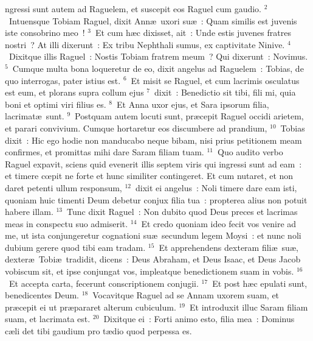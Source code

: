 \bchapter
{}ngressi sunt autem ad Raguelem, et suscepit eos Raguel cum gaudio.
${}^{2}$~Intuensque Tobiam Raguel, dixit Ann\ae\ uxori su\ae~: Quam similis est juvenis iste consobrino meo~!
${}^{3}$~Et cum h\ae c dixisset, ait~: Unde estis juvenes fratres nostri~? At illi dixerunt~: Ex tribu Nephthali sumus, ex captivitate Ninive.
${}^{4}$~Dixitque illis Raguel~: Nostis Tobiam fratrem meum~? Qui dixerunt~: Novimus.
${}^{5}$~Cumque multa bona loqueretur de eo, dixit angelus ad Raguelem~: Tobias, de quo interrogas, pater istius est.
${}^{6}$~Et misit se Raguel, et cum lacrimis osculatus est eum, et plorans supra collum ejus
${}^{7}$~dixit~: Benedictio sit tibi, fili mi, quia boni et optimi viri filius es.
${}^{8}$~Et Anna uxor ejus, et Sara ipsorum filia, lacrimat\ae\ sunt.
${}^{9}$~Postquam autem locuti sunt, pr\ae cepit Raguel occidi arietem, et parari convivium. Cumque hortaretur eos discumbere ad prandium,
${}^{10}$~Tobias dixit~: Hic ego hodie non manducabo neque bibam, nisi prius petitionem meam confirmes, et promittas mihi dare Saram filiam tuam.
${}^{11}$~Quo audito verbo Raguel expavit, sciens quid evenerit illis septem viris qui ingressi sunt ad eam~: et timere cœpit ne forte et hunc similiter contingeret. Et cum nutaret, et non daret petenti ullum responsum,
${}^{12}$~dixit ei angelus~: Noli timere dare eam isti, quoniam huic timenti Deum debetur conjux filia tua~: propterea alius non potuit habere illam.
${}^{13}$~Tunc dixit Raguel~: Non dubito quod Deus preces et lacrimas meas in conspectu suo admiserit.
${}^{14}$~Et credo quoniam ideo fecit vos venire ad me, ut ista conjungeretur cognationi su\ae\ secundum legem Moysi~: et nunc noli dubium gerere quod tibi eam tradam.
${}^{15}$~Et apprehendens dexteram fili\ae\ su\ae , dexter\ae\ Tobi\ae\ tradidit, dicens~: Deus Abraham, et Deus Isaac, et Deus Jacob vobiscum sit, et ipse conjungat vos, impleatque benedictionem suam in vobis.
${}^{16}$~Et accepta carta, fecerunt conscriptionem conjugii.
${}^{17}$~Et post h\ae c epulati sunt, benedicentes Deum.
${}^{18}$~Vocavitque Raguel ad se Annam uxorem suam, et pr\ae cepit ei ut pr\ae pararet alterum cubiculum.
${}^{19}$~Et introduxit illuc Saram filiam suam, et lacrimata est.
${}^{20}$~Dixitque ei~: Forti animo esto, filia mea~: Dominus c\ae li det tibi gaudium pro t\ae dio quod perpessa es.

